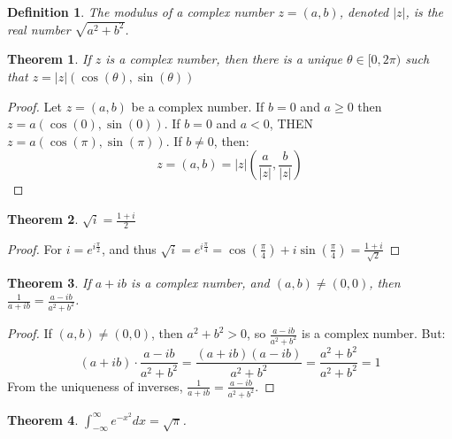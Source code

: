 \documentclass{article}
\theoremstyle{mystyle}
\newtheorem{theorem}{Theorem}[section]
\newtheorem{definition}{Definition}[section]
\begin{document}
\begin{definition}
The modulus of a complex number $z = (a,b)$, denoted $|z|$, is the real number $\sqrt{a^2+b^2}$.
\end{definition}
\begin{theorem}
If $z$ is a complex number, then there is a unique $\theta \in [0,2\pi)$ such that $z =|z|(\cos(\theta),\sin(\theta))$
\end{theorem}
\begin{proof}
Let $z=(a,b)$ be a complex number. If $b=0$ and $a\geq 0$ then $z = a(\cos(0),\sin(0))$. If $b=0$ and $a<0$, THEN $z=a(\cos(\pi),\sin(\pi))$. If $b\ne 0$, then:
\begin{equation*}
    z = (a,b) = |z|(\frac{a}{|z|},\frac{b}{|z|})
\end{equation*}
\end{proof}
\begin{theorem}
$\sqrt{i} = \frac{1+i}{2}$
\end{theorem}
\begin{proof}
For $i = e^{i\frac{\pi}{2}}$, and thus $\sqrt{i} = e^{i\frac{\pi}{4}} = \cos(\frac{\pi}{4})+i\sin(\frac{\pi}{4}) = \frac{1+i}{\sqrt{2}}$
\end{proof}
\begin{theorem}
If $a+ib$ is a complex number, and $(a,b) \ne (0,0)$, then $\frac{1}{a+ib} = \frac{a-ib}{a^2+b^2}$.
\end{theorem}
\begin{proof}
If $(a,b)\ne (0,0)$, then $a^2+b^2>0$, so $\frac{a-ib}{a^2+b^2}$ is a complex number. But:
\begin{equation*}
    (a+ib)\cdot \frac{a-ib}{a^2+b^2} = \frac{(a+ib)(a-ib)}{a^2+b^2} = \frac{a^2+b^2}{a^2+b^2} = 1
\end{equation*}
From the uniqueness of inverses, $\frac{1}{a+ib} = \frac{a-ib}{a^2+b^2}$.
\end{proof}
\begin{theorem}
$\int_{-\infty}^{\infty}e^{-x^2}dx = \sqrt{\pi}$.
\end{theorem}
\end{document}
